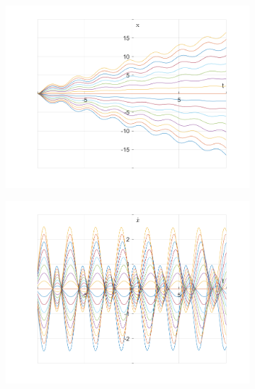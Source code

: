 \documentclass{article}
\begin{document}
	\begin{figure}[h!]
		\centering
		\begin{subfigure}[b]{0.48\linewidth}
			\includegraphics[width=\linewidth]{./SmallOscillations/S12/F3.png}
		\end{subfigure}
		\begin{subfigure}[b]{0.48\linewidth}
			\includegraphics[width=\linewidth]{./SmallOscillations/S12/F4.png}
		\end{subfigure}
	\end{figure}
	
\end{document}
